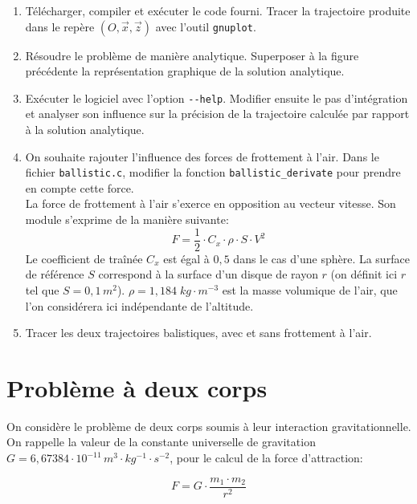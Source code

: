 \documentclass[twoside, symmetric]{tufte-handout}
\begin{document}
\begin{enumerate}
    \item Télécharger, compiler et exécuter le code fourni. Tracer la
        trajectoire produite dans le repère $\left( O, \vec{x}, \vec{z} \right)$
        avec l'outil \texttt{gnuplot}.
    \item Résoudre le problème de manière analytique. Superposer à la figure
        précédente la représentation graphique de la solution analytique.
    \item Exécuter le logiciel avec l'option \verb+--help+. Modifier ensuite le
        pas d'intégration et analyser son influence sur la précision de la
        trajectoire calculée par rapport à la solution analytique.
    \item On souhaite rajouter l'influence des forces de frottement à l'air.
        Dans le fichier \texttt{ballistic.c}, modifier la fonction
        \texttt{ballistic\_derivate} pour prendre en compte cette force. \\La
        force de frottement à l'air s'exerce en opposition au vecteur
        vitesse. Son module s'exprime de la manière suivante:
        \begin{equation}
            F = \frac{1}{2}\cdot C_x \cdot \rho \cdot S \cdot V^{2}
            \label{eqn:cx}
        \end{equation}
        Le coefficient de traînée $C_x$ est égal à $0,5$ dans le cas d'une
        sphère. La surface de référence $S$ correspond à la surface d'un
        disque de rayon $r$ (on définit ici $r$ tel que $S=0,1\,m^{2}$).
        $\rho = 1,184\;kg\cdot m^{-3}$ est la masse volumique de l'air, que l'on
        considérera ici indépendante de l'altitude.
    \item Tracer les deux trajectoires balistiques, avec et sans frottement à
        l'air.
\end{enumerate}

\section{Problème à deux corps}

On considère le problème de deux corps soumis à leur interaction
gravitationnelle. On rappelle la valeur de la constante universelle de
gravitation $G=6,67384\cdot 10^{-11}\,m^3\cdot kg^{-1}\cdot s^{-2}$, pour
le calcul de la force d'attraction:

\begin{equation}
    F = G\cdot\frac{m_1\cdot m_2}{r^2}
    \label{eqn:g}
\end{equation}
\end{document}

